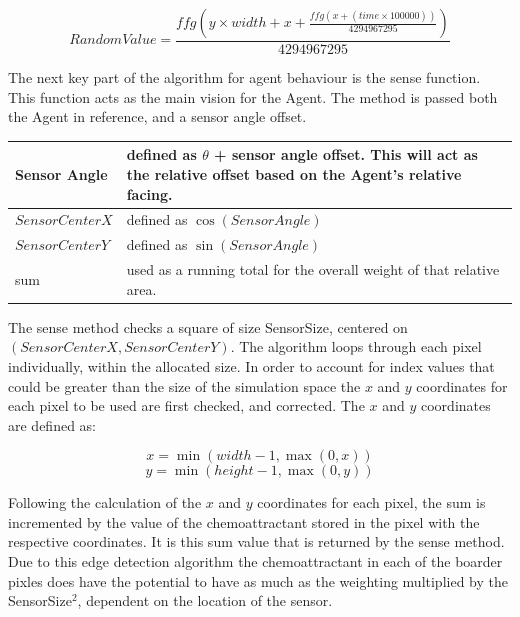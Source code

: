 \documentclass[]{report}
\begin{document}
\begin{equation}
    RandomValue = \frac{ffg\left(y \times width + x + \frac{ffg(x + (time \times 100000))}{4294967295}\right)}{4294967295}
\end{equation}

The next key part of the algorithm for agent behaviour is the sense function. This function acts as the main vision for the Agent. The method is passed both the Agent in reference, and a sensor angle offset.

\begin{center}
\begin{tabular}{ | m{8em} | m{7cm}| } 
  \hline
   Sensor Angle & defined as $\theta$ + sensor angle offset. This will act as the relative offset based on the Agent's relative facing. \\
  \hline
   $SensorCenterX$ &  defined as $\cos{(Sensor Angle)}$\\ 
  \hline
   $SensorCenterY$ &  defined as $\sin{(Sensor Angle)}$\\ 
  \hline
   sum & used as a running total for the overall weight of that relative area.\\ 
  \hline
\end{tabular}
\end{center}

The sense method checks a square of size SensorSize, centered on $(SensorCenterX, SensorCenterY)$. The algorithm loops through each pixel individually, within the allocated size. In order to account for index values that could be greater than the size of the simulation space the $x$ and $y$ coordinates for each pixel to be used are first checked, and corrected. The $x$ and $y$ coordinates are defined as:

\begin{equation}\label{xbound}
    x = \min(width -1, \max(0, x))
\end{equation}
\begin{equation}\label{ybound}
    y = \min(height - 1, \max(0, y))
\end{equation}

Following the calculation of the $x$ and $y$ coordinates for each pixel, the sum is incremented by the value of the chemoattractant stored in the pixel with the respective coordinates. It is this sum value that is returned by the sense method. Due to this edge detection algorithm the chemoattractant in each of the boarder pixles does have the potential to have as much as the weighting multiplied by the SensorSize$^2$, dependent on the location of the sensor. 
\end{document}
